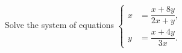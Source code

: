 Solve the system of equations $\left\{\begin{aligned} x &=\dfrac{x+8y}{2x+y}, \\ y &=\dfrac{x+4y}{3x}. \end{aligned}\right.$
